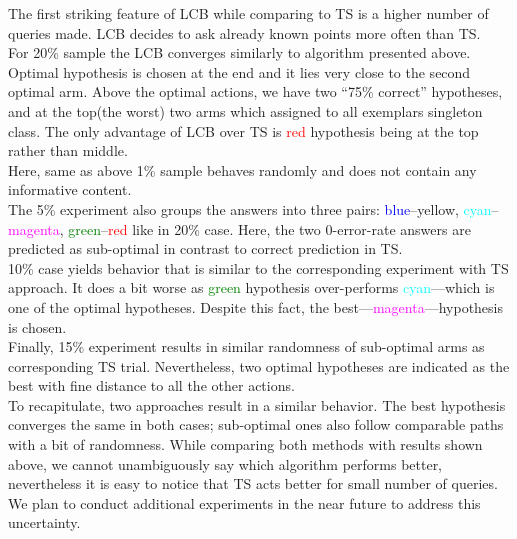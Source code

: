 \documentclass[12pt, a4paper, pdflatex, leqno, twoside]{report}
\begin{document}
The first striking feature of LCB while comparing to TS is a higher number of 
queries made. LCB decides to ask already known points more often than TS.\\
For 20\% sample the LCB converges similarly to algorithm presented above. 
Optimal hypothesis is chosen at the end and it lies very close to the second 
optimal arm. Above the optimal actions, we have two ``75\% correct'' hypotheses, 
and at the top(the worst) two arms which assigned to all exemplars singleton 
class. The only advantage of LCB over TS is \textcolor{red}{red} hypothesis 
being at the top rather than middle.\\
Here, same as above 1\% sample behaves randomly and does not contain any 
informative content.\\
The 5\% experiment also groups the answers into three pairs: 
\textcolor{blue}{blue}--\textcolor{Dandelion}{yellow}, \textcolor{cyan}{cyan}--
\textcolor{magenta}{magenta}, \textcolor{green}{green}--\textcolor{red}{red} 
like in 20\% case. Here, the two 0-error-rate answers are predicted as sub-optimal in contrast to correct prediction in TS.\\
10\% case yields behavior that is similar to the corresponding experiment with TS approach. 
It does a bit worse as \textcolor{green}{green} hypothesis over-performs 
\textcolor{cyan}{cyan}---which is one of the optimal hypotheses. Despite this fact, 
the best---\textcolor{magenta}{magenta}---hypothesis is chosen.\\
Finally, 15\% experiment results in similar randomness of sub-optimal arms as 
corresponding TS trial. Nevertheless, two optimal hypotheses are indicated as 
the best with fine distance to all the other actions.\\

To recapitulate, two approaches result in a similar behavior. The best hypothesis 
converges the same in both cases; sub-optimal ones also follow comparable paths 
with a bit of randomness. While comparing both methods with results shown above, 
we cannot unambiguously say which algorithm performs better, nevertheless it is easy to notice that TS acts better for small number of queries. We plan to conduct 
additional experiments in the near future to address this uncertainty.\\
\end{document}
